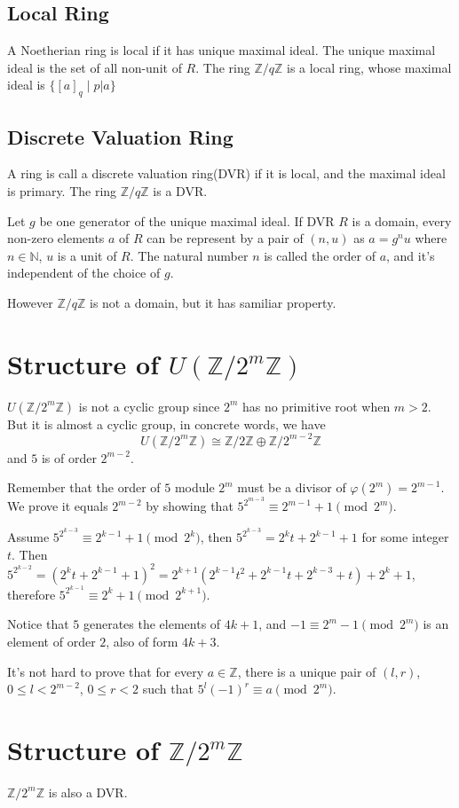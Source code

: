 \documentclass{article}
\def\zmod#1{\mathbb Z / {#1} \mathbb Z}
\def\zmodu#1{U(\mathbb Z / {#1} \mathbb Z)}
\begin{document}
\subsection{Local Ring}
A Noetherian ring is local if it has unique maximal ideal.
The unique maximal ideal is the set of all non-unit of $R$.
The ring $\mathbb Z / q \mathbb Z$ is a local ring, whose maximal ideal is
$\{[a]_q \mid p \vert a\}$

\subsection{Discrete Valuation Ring}
A ring is call a discrete valuation ring(DVR) if it is local, and the maximal ideal is primary.
The ring $\mathbb Z / q \mathbb Z$ is a DVR.

Let $g$ be one generator of the unique maximal ideal.
If DVR $R$ is a domain, every non-zero elements $a$ of $R$ can be represent by a pair of $(n, u)$ as $a = g^n u$
where $n \in \mathbb N$, $u$ is a unit of $R$.
The natural number $n$ is called the order of $a$, and it's independent of the choice of $g$.

However $\zmod q$ is not a domain, but it has samiliar property.

\section{Structure of $\zmodu{2^m}$}
$\zmodu{2^m}$ is not a cyclic group since $2^m$ has no primitive root when $m > 2$.
But it is almost a cyclic group, in concrete words, we have
$$\zmodu{2^m} \cong \zmod 2 \oplus \zmod{2^{m-2}}$$
and $5$ is of order $2^{m-2}$.

Remember that the order of $5$ module $2^m$ must be a divisor of $\varphi(2^m) = 2^{m-1}$.
We prove it equals $2^{m-2}$ by showing that $5^{2^{m-3}} \equiv 2^{m-1} + 1 \pmod{2^m}$.

Assume $5^{2^{k-3}} \equiv 2^{k-1} + 1 \pmod{2^k}$, then $5^{2^{k-3}} = 2^k t + 2^{k-1} + 1$ for some integer $t$.
Then $5^{2^{k-2}} = (2^k t + 2^{k-1} + 1)^2 = 2^{k+1}(2^{k-1}t^2 + 2^{k-1}t + 2^{k-3} + t) + 2^k + 1$,
therefore $5^{2^{k-1}} \equiv 2^k + 1 \pmod{2^{k + 1}}$.

Notice that $5$ generates the elements of $4k + 1$,
and $-1 \equiv 2^m - 1 \pmod{2^m}$ is an element of order $2$, also of form $4k + 3$.

It's not hard to prove that for every $a \in \mathbb Z$, there is a unique pair of $(l, r)$,
$0 \leq l < 2^{m-2}$, $0 \leq r < 2$ such that $5^l(-1)^r \equiv a \pmod{2^m}$.

\section{Structure of $\zmod{2^m}$}
$\zmod{2^m}$ is also a DVR.
\end{document}
